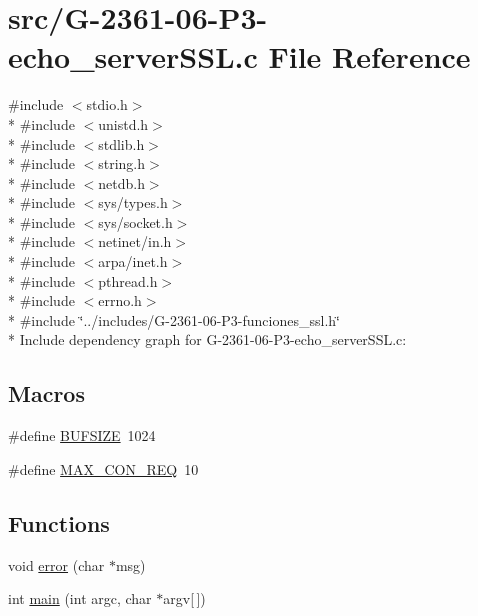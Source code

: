 \hypertarget{_g-2361-06-_p3-echo__server_s_s_l_8c}{}\section{src/\+G-\/2361-\/06-\/\+P3-\/echo\+\_\+server\+S\+SL.c File Reference}
\label{_g-2361-06-_p3-echo__server_s_s_l_8c}
{\ttfamily \#include $<$stdio.\+h$>$}\\*
{\ttfamily \#include $<$unistd.\+h$>$}\\*
{\ttfamily \#include $<$stdlib.\+h$>$}\\*
{\ttfamily \#include $<$string.\+h$>$}\\*
{\ttfamily \#include $<$netdb.\+h$>$}\\*
{\ttfamily \#include $<$sys/types.\+h$>$}\\*
{\ttfamily \#include $<$sys/socket.\+h$>$}\\*
{\ttfamily \#include $<$netinet/in.\+h$>$}\\*
{\ttfamily \#include $<$arpa/inet.\+h$>$}\\*
{\ttfamily \#include $<$pthread.\+h$>$}\\*
{\ttfamily \#include $<$errno.\+h$>$}\\*
{\ttfamily \#include \char`\"{}../includes/\+G-\/2361-\/06-\/\+P3-\/funciones\+\_\+ssl.\+h\char`\"{}}\\*
Include dependency graph for G-\/2361-\/06-\/\+P3-\/echo\+\_\+server\+S\+SL.c\+:
\subsection*{Macros}
\begin{DoxyCompactItemize}
\item 
\#define \hyperlink{_g-2361-06-_p3-echo__server_s_s_l_8c_aeca034f67218340ecb2261a22c2f3dcd}{B\+U\+F\+S\+I\+ZE}~1024
\item 
\#define \hyperlink{_g-2361-06-_p3-echo__server_s_s_l_8c_a3e4b4faa36cc9e3a7d9895aec8f27592}{M\+A\+X\+\_\+\+C\+O\+N\+\_\+\+R\+EQ}~10
\end{DoxyCompactItemize}
\subsection*{Functions}
\begin{DoxyCompactItemize}
\item 
void \hyperlink{_g-2361-06-_p3-echo__server_s_s_l_8c_aad9796c174f7ef5d226cd169f2520fd5}{error} (char $\ast$msg)
\item 
int \hyperlink{_g-2361-06-_p3-echo__server_s_s_l_8c_a0ddf1224851353fc92bfbff6f499fa97}{main} (int argc, char $\ast$argv\mbox{[}$\,$\mbox{]})
\end{DoxyCompactItemize}


